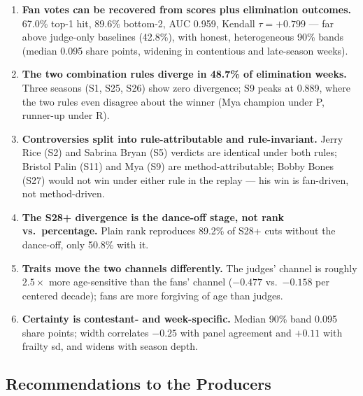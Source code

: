 \documentclass[10pt]{article}
\begin{document}
\begin{enumerate}[itemsep=1pt]
\item \textbf{Fan votes can be recovered from scores plus elimination outcomes.} 67.0\%
top-1 hit, 89.6\% bottom-2, AUC 0.959, Kendall $\tau = +0.799$ --- far above judge-only
baselines (42.8\%), with honest, heterogeneous 90\% bands (median 0.095 share points,
widening in contentious and late-season weeks).
\item \textbf{The two combination rules diverge in 48.7\% of elimination weeks.} Three
seasons (S1, S25, S26) show zero divergence; S9 peaks at 0.889, where the two rules even
disagree about the winner (Mya champion under P, runner-up under R).
\item \textbf{Controversies split into rule-attributable and rule-invariant.} Jerry Rice
(S2) and Sabrina Bryan (S5) verdicts are identical under both rules; Bristol Palin (S11)
and Mya (S9) are method-attributable; Bobby Bones (S27) would not win under either rule in
the replay --- his win is fan-driven, not method-driven.
\item \textbf{The S28+ divergence is the dance-off stage, not rank vs.\ percentage.} Plain
rank reproduces 89.2\% of S28+ cuts without the dance-off, only 50.8\% with it.
\item \textbf{Traits move the two channels differently.} The judges' channel is roughly
$2.5\times$ more age-sensitive than the fans' channel ($-0.477$ vs.\ $-0.158$ per centered
decade); fans are more forgiving of age than judges.
\item \textbf{Certainty is contestant- and week-specific.} Median 90\% band 0.095 share
points; width correlates $-0.25$ with panel agreement and $+0.11$ with frailty sd, and
widens with season depth.
\end{enumerate}

\subsection{Recommendations to the Producers}
\end{document}
